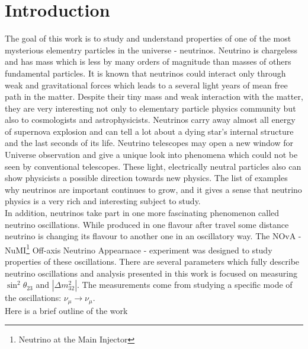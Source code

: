 \chapter{Introduction}
\label{intro_chapter}

The goal of this work is to study and understand properties of one of the most 
mysterious elementry particles in the universe - neutrinos. Neutrino is chargeless and 
has mass which is less by many orders of magnitude than masses of others fundamental 
particles. It is known that neutrinos could interact only through weak and 
gravitational forces which leads to a several light years of mean free path in 
the matter. Despite their tiny mass and weak interaction with the matter, they are 
very interesting not only to elementary particle physics community but also to 
cosmologists and astrophysicists. Neutrinos carry away almost all energy of supernova 
explosion and can tell a lot about a dying star's internal structure and the last 
seconds of its life. Neutrino telescopes may open a new window for Universe observation 
and give a unique look into phenomena which could not be seen by conventional 
telescopes. These light, electrically neutral particles also can show physicists 
a possible direction towards new physics. The list of examples why neutrinos are 
important continues to grow, and it gives a sense that neutrino physics is a 
very rich and interesting subject to study.\\

In addition, neutrinos take part in one more fascinating phenomenon called neutrino
oscillations. While produced in one flavour after travel some distance neutrino is 
changing its flavour to another one in an oscillatory way. The NOvA - 
NuMI\footnote{Neutrino at the Main Injector} Off-axis Neutrino Appearnace - experiment
was designed to study properties of these oscillations. There are several
parameters which fully describe neutrino oscillations and analysis presented in this work 
is focused on measuring $\sin^2\theta_{23}$ and $|\Delta m^2_{32}|$. The measurements 
come from studying a specific mode of the oscillations: $\nu_\mu \rightarrow \nu_\mu$.\\

Here is a brief outline of the work

